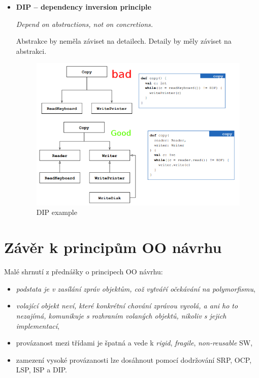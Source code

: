 \documentclass{szzclass}
\begin{document}
\begin{itemize}
      \item \textbf{DIP -- dependency inversion principle}

      \textit{Depend on abstractions, not on concretions.}

      Abstrakce by neměla záviset na detailech. Detaily by měly záviset na abstrakci.
      \begin{figure}[ht]
            \centering
            \includegraphics[width=1\textwidth]{topics/bi-wsi-si-9/dip.png}
            \caption{DIP example}
      \end{figure}


\end{itemize}

\section{Závěr k principům OO návrhu}

Malé shrnutí z přednášky o principech OO návrhu:

\begin{itemize}
      \item \textit{podstata je v zasílání zpráv objektům, což vytváří očekávání na polymorfismu},
      \item \textit{volající objekt neví, které konkrétní chování zprávou vyvolá, a ani ho to nezajímá,
      komunikuje s rozhraním volaných objektů, nikoliv s jejich implementací},
      \item provázanost mezi třídami je špatná a vede k \textit{rigid}, \textit{fragile}, \textit{non-reusable} SW,
      \item zamezení vysoké provázanosti lze dosáhnout pomocí dodržování SRP, OCP, LSP, ISP a DIP.
\end{itemize}
\end{document}
